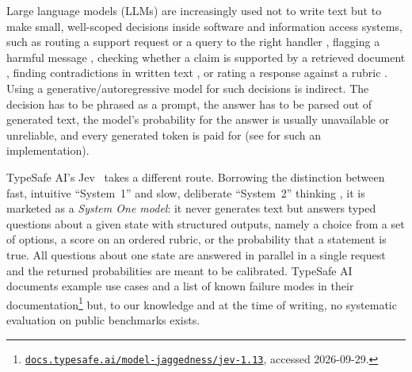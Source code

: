 \documentclass[table]{article}
\begin{document}
Large language models (LLMs) are increasingly used not to write text but to make small, well-scoped decisions inside software and information access systems, such as routing a support request or a query to the right handler \cite{liu2025tickit}, flagging a harmful message \cite{inan2023llamaguardllmbasedinputoutput}, checking whether a claim is supported by a retrieved document \cite{tang-etal-2024-minicheck}, finding contradictions in written text \cite{deusser2023uncovering}, or rating a response against a rubric \cite{kim2024prometheus}. Using a generative/autoregressive model for such decisions is indirect. The decision has to be phrased as a prompt, the answer has to be parsed out of generated text, the model's probability for the answer is usually unavailable or unreliable, and every generated token is paid for (see  for such an implementation).

TypeSafe AI's Jev~\cite{typesafe2026jev} takes a different route. Borrowing the distinction between fast, intuitive ``System~1'' and slow, deliberate ``System~2'' thinking \cite{kahneman2011thinking}, it is marketed as a \emph{System One model}: it never generates text but answers typed questions about a given state with structured outputs, namely a choice from a set of options, a score on an ordered rubric, or the probability that a statement is true. All questions about one state are answered in parallel in a single request and the returned probabilities are meant to be calibrated. TypeSafe AI documents example use cases and a list of known failure modes in their documentation\footnote{\href{https://docs.typesafe.ai/model-jaggedness/jev-1.13}{\texttt{docs.typesafe.ai/model-jaggedness/jev-1.13}}, accessed 2026-09-29.} but, to our knowledge and at the time of writing, no systematic evaluation on public benchmarks exists. 
\end{document}

